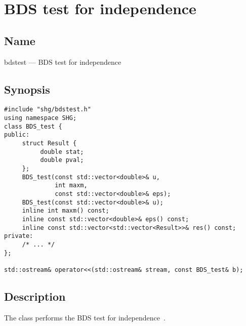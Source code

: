 \chapter{BDS test for independence}

\section{Name}

bdstest --- BDS test for independence

\section{Synopsis}

{\small \begin{verbatim}
#include "shg/bdstest.h"
using namespace SHG;
class BDS_test {
public:
     struct Result {
          double stat;
          double pval;
     };
     BDS_test(const std::vector<double>& u,
              int maxm,
              const std::vector<double>& eps);
     BDS_test(const std::vector<double>& u);
     inline int maxm() const;
     inline const std::vector<double>& eps() const;
     inline const std::vector<std::vector<Result>>& res() const;
private:
     /* ... */
};

std::ostream& operator<<(std::ostream& stream, const BDS_test& b);
\end{verbatim}}

\section{Description}

The class performs the BDS test for independence~\cite
{brock-dechert-scheinkman-lebaron-1996}.

